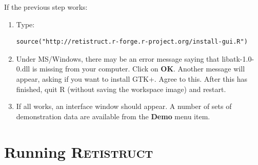 \documentclass{article}
\begin{document}
If the previous step works:
\begin{enumerate}
\item Type:
\begin{verbatim}
source("http://retistruct.r-forge.r-project.org/install-gui.R")
\end{verbatim}
\item Under MS/Windows, there may be an  error message saying that
  libatk-1.0-0.dll is missing from your computer. Click on
  \textbf{OK}. Another message will appear, asking if you want to
  install GTK+. Agree to this.  After this has finished, quit R
  (without saving the workspace image) and restart.
\item If all works, an interface window should appear. A number of
  sets of demonstration data are available from the \textbf{Demo} menu item.
\end{enumerate}




\section{Running \textsc{Retistruct}}
\label{manual:sec:running}
\end{document}
